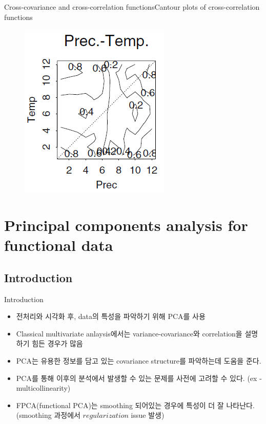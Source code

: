 \documentclass{beamer}
\begin{document}
\begin{frame}{Cross-covariance and cross-correlation functions}{Cantour plots of cross-correlation functions}
\begin{multicols}{2}
\begin{figure}[h]
\begin{center}
			\includegraphics[width=0.9\linewidth]{img/13.png}
		\end{center}
		\label{fig:long}
		\label{fig:onecol}
	\end{figure}
\end{multicols}
\end{frame}

\section{Principal components analysis for functional data}

\subsection{Introduction}

\begin{frame}{Introduction}
	\begin{itemize}
		\item {
			전처리와 시각화 후, data의 특성을 파악하기 위해 PCA를 사용
		}
		\item {
			Classical multivariate anlaysis에서는 variance-covariance와 correlation을 설명하기 힘든 경우가 많음
		}
		\item {
			PCA는 유용한 정보를 담고 있는 covariance structure를 파악하는데 도움을 준다.
		}
		\item {
			PCA를 통해 이후의 분석에서 발생할 수 있는 문제를 사전에 고려할 수 있다. (ex - multicollinearity)
		}
		\item {
			FPCA(functional PCA)는 smoothing 되어있는 경우에 특성이 더 잘 나타난다. (smoothing 과정에서 $regularization$ issue 발생)
		}
	\end{itemize}
\end{frame}
\end{document}

